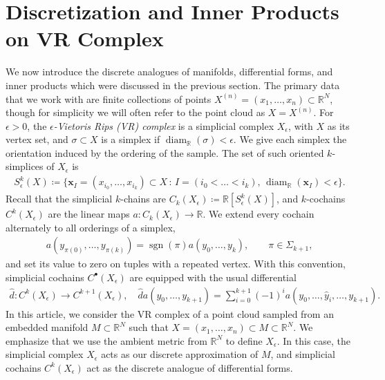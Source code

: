 \documentclass[11pt,reqno]{amsproc}
\numberwithin{equation}{section}
\newcommand{\R}{\mathbb{R}}
\newcommand{\bx}{\mathbf{x}}
\newcommand{\hd}{\hat{d}}
\newcommand{\sgn}{\operatorname{sgn}}
\newcommand{\diam}{\operatorname{diam}}
\theoremstyle{definition}
\theoremstyle{plain}
\begin{document}
    \section{Discretization and Inner Products on VR Complex} \label{sec:discretization}

    We now introduce the discrete analogues of manifolds, differential forms, and inner products which were discussed in the previous section. The primary data that we work with are finite collections of points $X^{(n)} = (x_1, \ldots, x_n) \subset \R^N$, though for simplicity we will often refer to the point cloud as $X = X^{(n)}$. For $\epsilon > 0$, the \emph{$\epsilon$-Vietoris Rips (VR) complex} is a simplicial complex $X_\epsilon$, with $X$ as its vertex set, and $\sigma \subset X$ is a simplex if $\diam_\R(\sigma) < \epsilon$. We give each simplex the orientation induced by the ordering of the sample. The set of such oriented $k$-simplices of $X_\epsilon$ is
    \begin{align}
        S^k_\epsilon(X) \coloneqq \{ \bx_I = (x_{i_0}, \ldots, x_{i_k}) \subset X \, : \, I = (i_0 < \ldots < i_k), \, \diam_\R(\bx_I) < \epsilon\}. 
    \end{align}
    Recall that the simplicial $k$-chains are $C_k(X_\epsilon) \coloneqq \R[S^k_\epsilon(X)]$, and $k$-cochains $C^k(X_\epsilon)$ are the linear maps $a: C_k(X_\epsilon) \to \R$. We extend every cochain alternately to all orderings of a simplex,
    \begin{align} \label{eq:alternating_cochain_convention}
        a(y_{\pi(0)},\ldots,y_{\pi(k)})
        =\sgn(\pi)a(y_0,\ldots,y_k), \qquad \pi\in\Sigma_{k+1},
    \end{align}
    and set its value to zero on tuples with a repeated vertex. With this convention, simplicial cochains $C^\bullet(X_\epsilon)$ are equipped with the usual differential
    \begin{align}
        \hd: C^k(X_\epsilon) \to C^{k+1}(X_\epsilon), \quad \hd a(y_0, \ldots, y_{k+1}) = \sum_{i=0}^{k+1} (-1)^i a(y_0, \ldots, \hat{y}_i, \ldots, y_{k+1}).
    \end{align}
    In this article, we consider the VR complex of a point cloud sampled from an embedded manifold $M \subset \R^N$ such that $X = (x_1, \ldots, x_n) \subset M \subset \R^N$. We emphasize that we use the ambient metric from $\R^N$ to define $X_\epsilon$. In this case, the simplicial complex $X_\epsilon$ acts as our discrete approximation of $M$, and simplicial cochains $C^k(X_\epsilon)$ act as the discrete analogue of differential forms.
\end{document}
